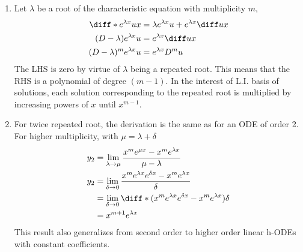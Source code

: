 \begin{enumerate}
\begin{enumerate}
                  \item Let $ \lambda $ be a root of the characteristic equation with
                        multiplicity
                        $ m $,
                        \begin{align}
                              \diff* {e^{\lambda x}u}{x}
                               & = \lambda e^{\lambda x}u + e^{\lambda x}\diff ux \\
                              (D - \lambda) e^{\lambda x} u
                               & = e^{\lambda x} \diff ux                         \\
                              (D - \lambda)^{m} e^{\lambda x} u
                               & = e^{\lambda x}D^{m}u
                        \end{align}
                        The LHS is zero by virtue of $ \lambda $ being a repeated root.
                        This means that the RHS is a polynomial of degree $ (m-1) $.
                        In the interest of L.I. basis of solutions, each solution
                        corresponding to the repeated root is multiplied by increasing
                        powers of $ x $ until $ x^{m-1} $.

                  \item For twice repeated root, the derivation is the same as for an
                        ODE of order 2.
                        For higher multiplicity, with $ \mu = \lambda + \delta $
                        \begin{align}
                              y_{2} & = \lim_{\lambda \to \mu} \frac{x^{m}e^{\mu x}
                              - x^{m}e^{\lambda x}}{\mu - \lambda}                   \\
                              y_{2} & = \lim_{\delta \to 0} \frac{x^{m}e^{\lambda x}
                              e^{\delta x} - x^{m}e^{\lambda x}}{\delta}             \\
                                    & = \lim_{\delta \to 0} \diff* {(x^{m}
                              e^{\lambda x}
                              e^{\delta x} - x^{m}e^{\lambda x})}{\delta}            \\
                                    & = x^{m+1}e^{\lambda x}
                        \end{align}
                        This result also generalizes from second order to higher order
                        linear h-ODEs with constant coefficients.
            \end{enumerate}


\end{enumerate}
